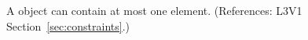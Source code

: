 A \Constraint object can contain at most one 
element.  (References: L3V1 Section~\ref{sec:constraints}.)
